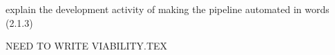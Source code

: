



\ac{explain the development activity of making the pipeline automated in words (2.1.3)}



\ac{ NEED TO WRITE VIABILITY.TEX}